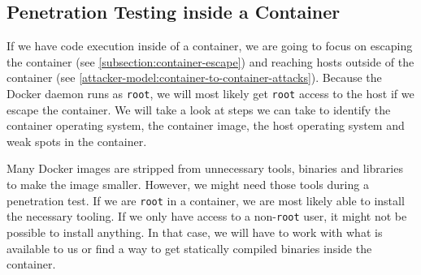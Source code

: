 \subsection{Penetration Testing inside a Container}\label{subsection:testing-container}
If we have code execution inside of a container, we are going to focus on escaping the container (see \autoref{subsection:container-escape}) and reaching hosts outside of the container (see \autoref{attacker-model:container-to-container-attacks}). Because the Docker daemon runs as \lstinline{root}, we will most likely get \lstinline{root} access to the host if we escape the container. We will take a look at steps we can take to identify the container operating system, the container image, the host operating system and weak spots in the container.

\medskip

Many Docker images are stripped from unnecessary tools, binaries and libraries to make the image smaller. However, we might need those tools during a penetration test. If we are \lstinline{root} in a container, we are most likely able to install the necessary tooling. If we only have access to a non-\lstinline{root} user, it might not be possible to install anything. In that case, we will have to work with what is available to us or find a way to get statically compiled binaries inside the container.









